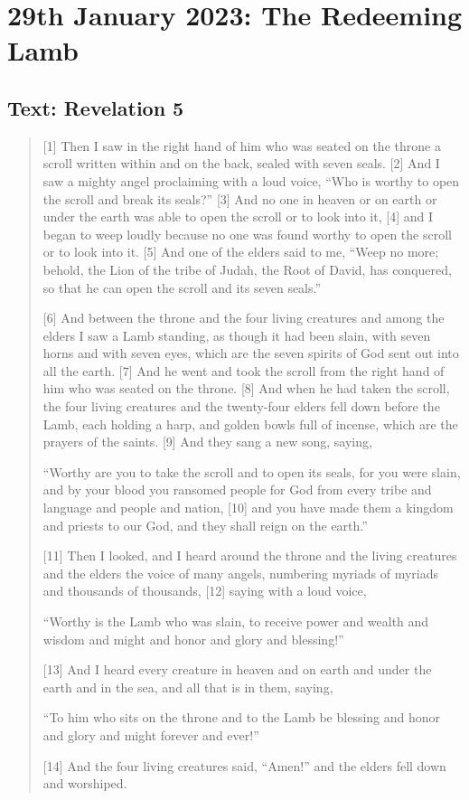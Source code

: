 \section{29th January 2023: The Redeeming Lamb}
\subsection*{Text: Revelation 5}
  \begin{quote}
    [1] Then I saw in the right hand of him who was seated on the throne a scroll written within and on the back, sealed with seven seals. [2] And I saw a mighty angel proclaiming with a loud voice, “Who is worthy to open the scroll and break its seals?” [3] And no one in heaven or on earth or under the earth was able to open the scroll or to look into it, [4] and I began to weep loudly because no one was found worthy to open the scroll or to look into it. [5] And one of the elders said to me, “Weep no more; behold, the Lion of the tribe of Judah, the Root of David, has conquered, so that he can open the scroll and its seven seals.”

    [6] And between the throne and the four living creatures and among the elders I saw a Lamb standing, as though it had been slain, with seven horns and with seven eyes, which are the seven spirits of God sent out into all the earth. [7] And he went and took the scroll from the right hand of him who was seated on the throne. [8] And when he had taken the scroll, the four living creatures and the twenty-four elders fell down before the Lamb, each holding a harp, and golden bowls full of incense, which are the prayers of the saints. [9] And they sang a new song, saying,

    “Worthy are you to take the scroll
        and to open its seals,
    for you were slain, and by your blood you ransomed people for God
        from every tribe and language and people and nation,
    [10] and you have made them a kingdom and priests to our God,
        and they shall reign on the earth.”

    [11] Then I looked, and I heard around the throne and the living creatures and the elders the voice of many angels, numbering myriads of myriads and thousands of thousands, [12] saying with a loud voice,

    “Worthy is the Lamb who was slain,
    to receive power and wealth and wisdom and might
    and honor and glory and blessing!”

    [13] And I heard every creature in heaven and on earth and under the earth and in the sea, and all that is in them, saying,

    “To him who sits on the throne and to the Lamb
    be blessing and honor and glory and might forever and ever!”

    [14] And the four living creatures said, “Amen!” and the elders fell down and worshiped.
  \end{quote}
